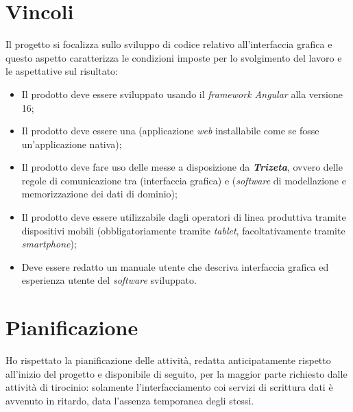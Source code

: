 \section{Vincoli}

Il progetto si focalizza sullo sviluppo di codice relativo all'interfaccia grafica e questo aspetto caratterizza le condizioni imposte per lo svolgimento del lavoro e le aspettative sul risultato:
\begin{itemize}
    \item Il prodotto deve essere sviluppato usando il \textit{framework Angular} alla versione 16;
    \item Il prodotto deve essere una  (applicazione \textit{web} installabile come se fosse un'applicazione nativa);
    \item Il prodotto deve fare uso delle  messe a disposizione da \textit{\textbf{Trizeta}}, ovvero delle regole di comunicazione tra  (interfaccia grafica) e  (\textit{software} di modellazione e memorizzazione dei dati di dominio);
    \item Il prodotto deve essere utilizzabile dagli operatori di linea produttiva tramite dispositivi mobili (obbligatoriamente tramite \textit{tablet}, facoltativamente tramite \textit{smartphone});
    \item Deve essere redatto un manuale utente che  descriva interfaccia grafica ed esperienza utente del \textit{software} sviluppato.
\end{itemize}

\section{Pianificazione}
\label{sec:pianificazione}
Ho rispettato la pianificazione delle attività, redatta anticipatamente rispetto all'inizio del progetto e disponibile di seguito, per la maggior parte  richiesto dalle attività di tirocinio: solamente l'interfacciamento coi servizi
di scrittura dati è avvenuto in ritardo, data l'assenza temporanea degli stessi.

